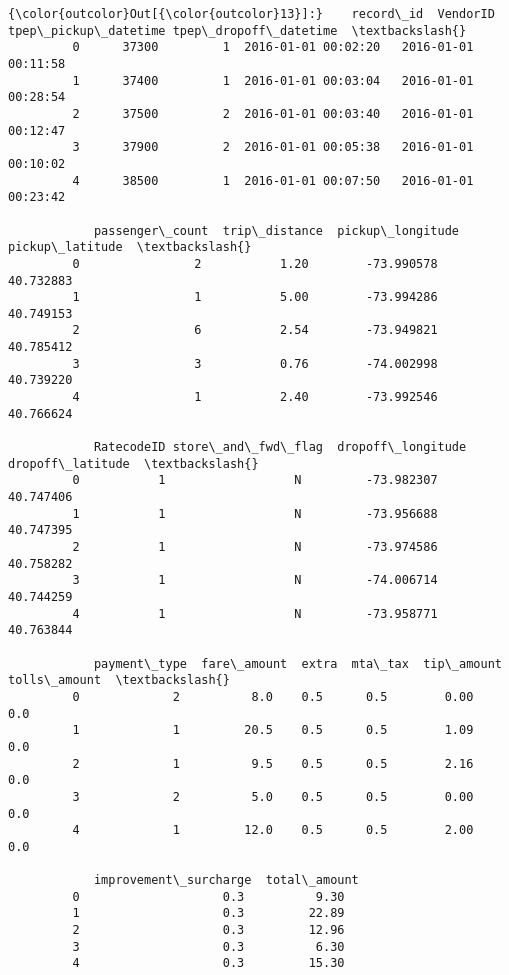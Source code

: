 \documentclass[11pt]{article}
\begin{document}
\begin{Verbatim}[commandchars=\\\{\}]
{\color{outcolor}Out[{\color{outcolor}13}]:}    record\_id  VendorID tpep\_pickup\_datetime tpep\_dropoff\_datetime  \textbackslash{}
         0      37300         1  2016-01-01 00:02:20   2016-01-01 00:11:58   
         1      37400         1  2016-01-01 00:03:04   2016-01-01 00:28:54   
         2      37500         2  2016-01-01 00:03:40   2016-01-01 00:12:47   
         3      37900         2  2016-01-01 00:05:38   2016-01-01 00:10:02   
         4      38500         1  2016-01-01 00:07:50   2016-01-01 00:23:42   
         
            passenger\_count  trip\_distance  pickup\_longitude  pickup\_latitude  \textbackslash{}
         0                2           1.20        -73.990578        40.732883   
         1                1           5.00        -73.994286        40.749153   
         2                6           2.54        -73.949821        40.785412   
         3                3           0.76        -74.002998        40.739220   
         4                1           2.40        -73.992546        40.766624   
         
            RatecodeID store\_and\_fwd\_flag  dropoff\_longitude  dropoff\_latitude  \textbackslash{}
         0           1                  N         -73.982307         40.747406   
         1           1                  N         -73.956688         40.747395   
         2           1                  N         -73.974586         40.758282   
         3           1                  N         -74.006714         40.744259   
         4           1                  N         -73.958771         40.763844   
         
            payment\_type  fare\_amount  extra  mta\_tax  tip\_amount  tolls\_amount  \textbackslash{}
         0             2          8.0    0.5      0.5        0.00           0.0   
         1             1         20.5    0.5      0.5        1.09           0.0   
         2             1          9.5    0.5      0.5        2.16           0.0   
         3             2          5.0    0.5      0.5        0.00           0.0   
         4             1         12.0    0.5      0.5        2.00           0.0   
         
            improvement\_surcharge  total\_amount  
         0                    0.3          9.30  
         1                    0.3         22.89  
         2                    0.3         12.96  
         3                    0.3          6.30  
         4                    0.3         15.30  
\end{Verbatim}
            
\end{document}
